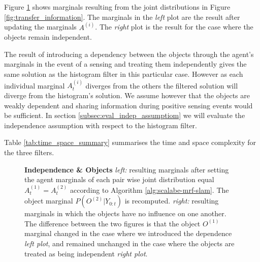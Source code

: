 Figure \ref{fig:independence_object} shows marginals resulting from the joint distributions in Figure \ref{fig:transfer_information}. The marginals in
the \textit{left} plot are the result after updating the marginals $A^{(i)}$. The \textit{right} plot is the result for the case where the objects
remain independent. 

The result of introducing a dependency between the objects through the agent's marginals in the event of a sensing and treating them
independently gives the same solution as the histogram filter in this particular case. However as each individual marginal $A^{(i)}_t$ diverges 
from the others the filtered solution will diverge from the histogram's solution. We assume however that the objects are weakly dependent 
and sharing information during positive sensing events would be sufficient. In section \ref{subsec:eval_indep_assumptiom} we will 
evaluate the independence assumption with respect to the histogram filter.

Table \ref{tab:time_space_summary} summarises the time and space complexity for the three filters.%

\begin{figure}
  \centering
  \caption{\textbf{Independence \& Objects} \textit{left:} resulting marginals after setting the agent marginals of each pair wise joint distribution
  equal $A^{(1)}_t = A^{(2)}_t$ according to Algorithm \ref{alg:scalabe-mrf-slam}. The object marginal $P(O^{(2)}|Y_{0:t})$ is recomputed. 
  \textit{right:} resulting marginals in which the objects have no influence on one another. The difference
   between the two figures is that the object $O^{(1)}$ marginal changed in the case where we introduced the dependence \textit{left plot}, and remained 
  unchanged in the case where the objects are treated as being independent \textit{right plot}.}
  \label{fig:independence_object}
\end{figure}


